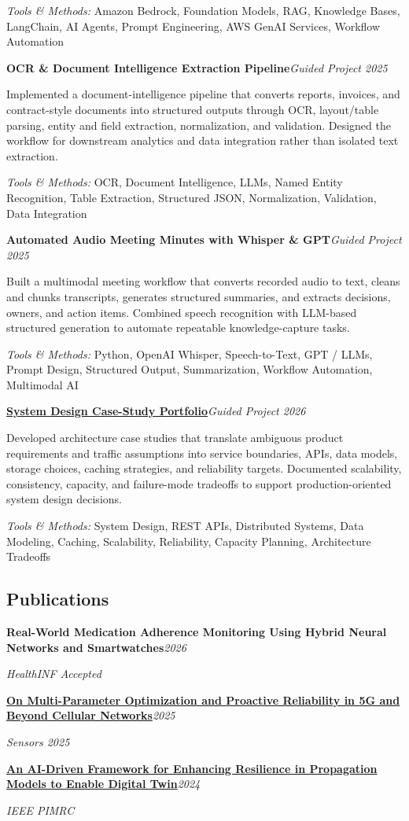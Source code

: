 \documentclass[9pt,letterpaper]{extarticle}
\newcommand{\entry}[2]{\Needspace{4\baselineskip}\textbf{#1}\hfill\textit{#2}\par}
\begin{document}
{\small\textit{Tools \& Methods:} Amazon Bedrock, Foundation Models, RAG, Knowledge Bases, LangChain, AI Agents, Prompt Engineering, AWS GenAI Services, Workflow Automation\par}
\vspace{1pt}
\entry{OCR \& Document Intelligence Extraction Pipeline}{Guided Project \textbar{} 2025}
Implemented a document-intelligence pipeline that converts reports, invoices, and contract-style documents into structured outputs through OCR, layout/table parsing, entity and field extraction, normalization, and validation. Designed the workflow for downstream analytics and data integration rather than isolated text extraction.\par
{\small\textit{Tools \& Methods:} OCR, Document Intelligence, LLMs, Named Entity Recognition, Table Extraction, Structured JSON, Normalization, Validation, Data Integration\par}
\vspace{1pt}
\entry{Automated Audio Meeting Minutes with Whisper \& GPT}{Guided Project \textbar{} 2025}
Built a multimodal meeting workflow that converts recorded audio to text, cleans and chunks transcripts, generates structured summaries, and extracts decisions, owners, and action items. Combined speech recognition with LLM-based structured generation to automate repeatable knowledge-capture tasks.\par
{\small\textit{Tools \& Methods:} Python, OpenAI Whisper, Speech-to-Text, GPT / LLMs, Prompt Design, Structured Output, Summarization, Workflow Automation, Multimodal AI\par}
\vspace{1pt}
\entry{\href{https://github.com/WaseemRaza844/system-design-masterclass}{System Design Case-Study Portfolio}}{Guided Project \textbar{} 2026}
Developed architecture case studies that translate ambiguous product requirements and traffic assumptions into service boundaries, APIs, data models, storage choices, caching strategies, and reliability targets. Documented scalability, consistency, capacity, and failure-mode tradeoffs to support production-oriented system design decisions.\par
{\small\textit{Tools \& Methods:} System Design, REST APIs, Distributed Systems, Data Modeling, Caching, Scalability, Reliability, Capacity Planning, Architecture Tradeoffs\par}
\vspace{1pt}
\subsection{Publications}
\entry{Real-World Medication Adherence Monitoring Using Hybrid Neural Networks and Smartwatches}{2026}
\textit{HealthINF \textbar{} Accepted}\par
\entry{\href{https://doi.org/10.3390/s25247651}{On Multi-Parameter Optimization and Proactive Reliability in 5G and Beyond Cellular Networks}}{2025}
\textit{Sensors 2025}\par
\entry{\href{https://doi.org/10.1109/PIMRC59610.2024.10817403}{An AI-Driven Framework for Enhancing Resilience in Propagation Models to Enable Digital Twin}}{2024}
\textit{IEEE PIMRC}\par
{}
\end{document}
